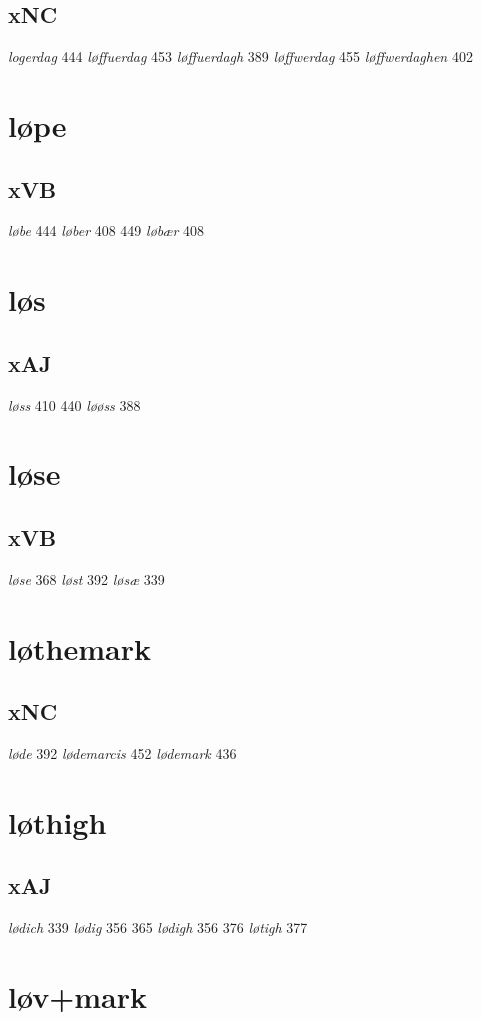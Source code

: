 \documentclass[a4paper,twocolumn]{article}
\begin{document}
\subsection{xNC}
\label{sec:org6c93b64}
\emph{logerdag} 444 \emph{løffuerdag} 453 \emph{løffuerdagh} 389 \emph{løffwerdag} 455 \emph{løffwerdaghen} 402 
\section{løpe}
\label{sec:org5637a79}
\subsection{xVB}
\label{sec:org932e7ba}
\emph{løbe} 444 \emph{løber} 408 449 \emph{løbær} 408 
\section{løs}
\label{sec:org43c882c}
\subsection{xAJ}
\label{sec:org1b5b529}
\emph{løss} 410 440 \emph{løøss} 388 
\section{løse}
\label{sec:org145c5d0}
\subsection{xVB}
\label{sec:org3eb8d63}
\emph{løse} 368 \emph{løst} 392 \emph{løsæ} 339 
\section{løthemark}
\label{sec:org7db0352}
\subsection{xNC}
\label{sec:org4b1529c}
\emph{løde} 392 \emph{lødemarcis} 452 \emph{lødemark} 436 
\section{løthigh}
\label{sec:orgd9743d2}
\subsection{xAJ}
\label{sec:org77d9ed2}
\emph{lødich} 339 \emph{lødig} 356 365 \emph{lødigh} 356 376 \emph{løtigh} 377 
\section{løv+mark}
\label{sec:org7bcf067}
\end{document}
